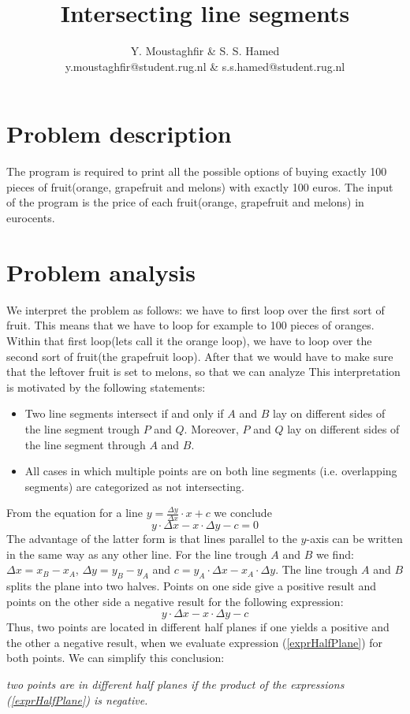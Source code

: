 \documentclass[a4paper,10pt]{article}
\title{Intersecting line segments}
\author{Y. Moustaghfir \& S. S. Hamed\\
        y.moustaghfir@student.rug.nl \& s.s.hamed@student.rug.nl}
\begin{document}
\maketitle

\section{Problem description}
The program is required to print all the possible options of buying exactly 100 pieces of fruit(orange, grapefruit and melons) with exactly 100 euro\textquotesingle s. The input of the program is the price of each fruit(orange, grapefruit and melons) in eurocents. 

\section{Problem analysis}
We interpret the problem as follows: we have to first loop over the first sort of fruit. This means that we have to loop for example to 100 pieces of oranges. Within that first loop(let\textquotesingle s call it the orange loop), we have to loop over the second sort of fruit(the grapefruit loop). After that we would have to make sure that the leftover fruit is set to melons, so that we can analyze 
This interpretation is motivated by the following statements:
\begin{itemize}
\item Two line segments intersect if and only if $A$ and $B$ lay on different sides of the line segment trough $P$ and $Q$. Moreover, $P$ and $Q$ lay on different sides of the line segment through $A$ and $B$.
\item All cases in which multiple points are on both line segments (i.e. overlapping segments) are categorized as not intersecting.
\end{itemize}
From the equation for a line $y = \frac{\Delta y}{\Delta x}\cdot x + c$ we conclude
$$ y\cdot \Delta x - x \cdot \Delta y - c = 0
$$ 
The advantage of the latter form is that lines parallel to the $y$-axis can be written in the same way as any other line.
For the line trough $A$ and $B$ we find: 
$\Delta x = x_B - x_A$, $\Delta y = y_B - y_A$ and $c = y_A \cdot \Delta x - x_A \cdot \Delta y$.
The line trough $A$ and $B$ splits the plane into two halves. Points on one side give a positive result and points on the other side a negative result for the following expression:
\begin{equation}\label{exprHalfPlane}
y \cdot \Delta x - x \cdot \Delta y - c
\end{equation}
Thus, two points are located in different half planes if one yields a positive and the other a negative result, when we evaluate expression (\ref{exprHalfPlane}) for both points.
We can simplify this conclusion: \\[2mm]
\centerline{\it two points are in different half planes if the product of the expressions (\ref{exprHalfPlane}) is negative.}
\end{document}
